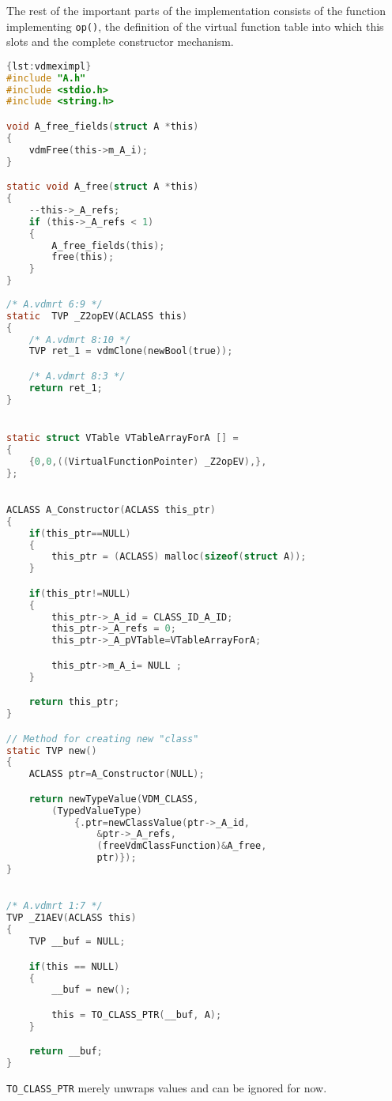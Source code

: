 %
%
%
The rest of the important parts of the implementation consists of the function implementing \texttt{op()}, the definition of the virtual function table into which this slots and the complete constructor mechanism.
%
%
%
\begin{lstlisting}[language=C,caption={Corresponding implementation file \texttt{A.c}.},label={lst:vdmeximpl},frame=tlbr]{lst:vdmeximpl}
#include "A.h"
#include <stdio.h>
#include <string.h>

void A_free_fields(struct A *this)
{
	vdmFree(this->m_A_i);
}

static void A_free(struct A *this)
{
	--this->_A_refs;
	if (this->_A_refs < 1)
	{
		A_free_fields(this);
		free(this);
	}
}
 
/* A.vdmrt 6:9 */
static  TVP _Z2opEV(ACLASS this)
{
	/* A.vdmrt 8:10 */
	TVP ret_1 = vdmClone(newBool(true));

	/* A.vdmrt 8:3 */
	return ret_1;
}


static struct VTable VTableArrayForA [] =
{
	{0,0,((VirtualFunctionPointer) _Z2opEV),},
};
 

ACLASS A_Constructor(ACLASS this_ptr)
{
	if(this_ptr==NULL)
	{
		this_ptr = (ACLASS) malloc(sizeof(struct A));
	}

	if(this_ptr!=NULL)
	{
		this_ptr->_A_id = CLASS_ID_A_ID;
		this_ptr->_A_refs = 0;
		this_ptr->_A_pVTable=VTableArrayForA;

		this_ptr->m_A_i= NULL ;
	}

	return this_ptr;
}

// Method for creating new "class"
static TVP new()
{
	ACLASS ptr=A_Constructor(NULL);

	return newTypeValue(VDM_CLASS,
		(TypedValueType)
			{.ptr=newClassValue(ptr->_A_id,
				&ptr->_A_refs,
				(freeVdmClassFunction)&A_free,
				ptr)});
}
 

/* A.vdmrt 1:7 */
TVP _Z1AEV(ACLASS this)
{
	TVP __buf = NULL;

	if(this == NULL)
	{
		__buf = new();

		this = TO_CLASS_PTR(__buf, A);
	}

	return __buf;
}
\end{lstlisting}
%
%
%
\texttt{TO\_CLASS\_PTR} merely unwraps values and can be ignored for now.

